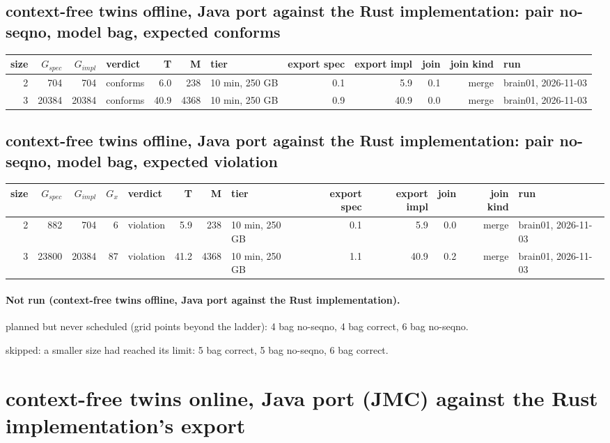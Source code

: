 \documentclass[10pt]{article}
\begin{document}
\subsection*{context-free twins offline, Java port against the Rust implementation: pair \textsf{no-seqno}, model bag, expected conforms}
\begin{longtable}{@{}rrrlrrlrrrrl@{}}
\toprule
size & $G_{\mathit{spec}}$ & $G_{\mathit{impl}}$ & verdict & T & M & tier & export spec & export impl & join & join kind & run \\
\midrule
\endhead
\color{blue} 2 & 704 & 704 & conforms & 6.0 & 238 & 10 min, 250 GB & 0.1 & 5.9 & 0.1 & merge & brain01, 2026-11-03 \\
\color{blue} 3 & 20384 & 20384 & conforms & 40.9 & 4368 & 10 min, 250 GB & 0.9 & 40.9 & 0.0 & merge & brain01, 2026-11-03 \\
\bottomrule
\end{longtable}
\subsection*{context-free twins offline, Java port against the Rust implementation: pair \textsf{no-seqno}, model bag, expected violation}
\begin{longtable}{@{}rrrrlrrlrrrrl@{}}
\toprule
size & $G_{\mathit{spec}}$ & $G_{\mathit{impl}}$ & $G_x$ & verdict & T & M & tier & export spec & export impl & join & join kind & run \\
\midrule
\endhead
\color{blue} 2 & 882 & 704 & 6 & violation & 5.9 & 238 & 10 min, 250 GB & 0.1 & 5.9 & 0.0 & merge & brain01, 2026-11-03 \\
\color{blue} 3 & 23800 & 20384 & 87 & violation & 41.2 & 4368 & 10 min, 250 GB & 1.1 & 40.9 & 0.2 & merge & brain01, 2026-11-03 \\
\bottomrule
\end{longtable}
\paragraph{Not run (context-free twins offline, Java port against the Rust implementation).}
planned but never scheduled (grid points beyond the ladder): 4 bag no-seqno, 4 bag correct, 6 bag no-seqno.\par
skipped: a smaller size had reached its limit: 5 bag correct, 5 bag no-seqno, 6 bag correct.\par
\section*{context-free twins online, Java port (JMC) against the Rust implementation's export}
\end{document}
